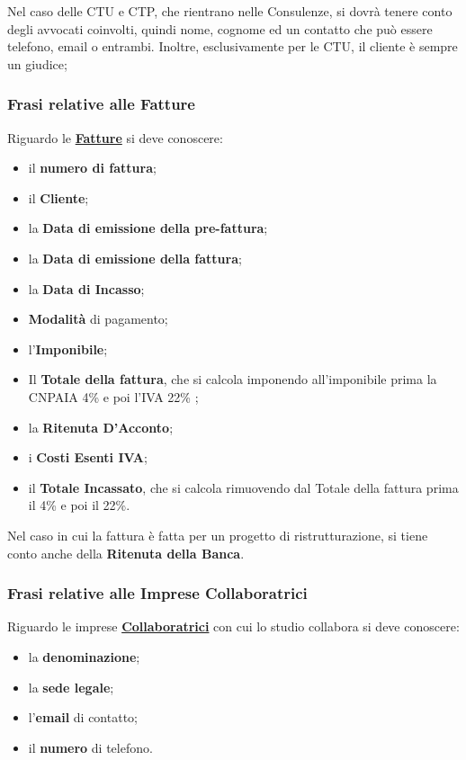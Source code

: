 \documentclass{elegantbook}
\begin{document}
	Nel caso delle CTU e CTP, che rientrano nelle Consulenze, si dovrà tenere conto degli avvocati coinvolti, quindi nome, cognome ed un contatto che può essere telefono, email o entrambi. Inoltre, esclusivamente per le CTU, il cliente è sempre un giudice;
	
	\subsubsection{Frasi relative alle Fatture}
	
	Riguardo le \underline{\textbf{Fatture}} si deve conoscere:
	\begin{itemize}
		\item il \textbf{numero di fattura};
		\item il \textbf{Cliente};
		\item la \textbf{Data di emissione della pre-fattura};
		\item la \textbf{Data di emissione della fattura};
		\item la \textbf{Data di Incasso};
		\item \textbf{Modalità} di pagamento;
		\item l'\textbf{Imponibile};
		\item Il \textbf{Totale della fattura}, che si calcola imponendo all'imponibile prima la CNPAIA 4\% e poi l'IVA 22\% ;
		\item la \textbf{Ritenuta D'Acconto};
		\item i \textbf{Costi Esenti IVA};
		\item il \textbf{Totale Incassato}, che si calcola rimuovendo dal Totale della fattura prima il 4\% e poi il 22\%.
	\end{itemize}
	
	Nel caso in cui la fattura è fatta per un progetto di ristrutturazione, si tiene conto anche della \textbf{Ritenuta della Banca}.
	
        \subsubsection{Frasi relative alle Imprese Collaboratrici}
	
	Riguardo le imprese \underline{\textbf{Collaboratrici}} con cui lo studio collabora si deve conoscere:
	\begin{itemize}
		\item la \textbf{denominazione};
		\item la \textbf{sede legale};
		\item l'\textbf{email} di contatto;
                \item il \textbf{numero} di telefono.
	\end{itemize}
\end{document}
